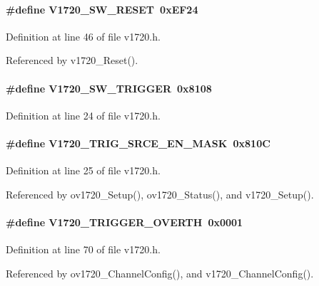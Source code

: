 \paragraph[{V1720\_\-SW\_\-RESET}]{\setlength{\rightskip}{0pt plus 5cm}\#define V1720\_\-SW\_\-RESET~0xEF24}\hfill\label{v1720_8h_a8f81434ad823f7ec252669892fabd1b0}


Definition at line 46 of file v1720.h.

Referenced by v1720\_\-Reset().
\paragraph[{V1720\_\-SW\_\-TRIGGER}]{\setlength{\rightskip}{0pt plus 5cm}\#define V1720\_\-SW\_\-TRIGGER~0x8108}\hfill\label{v1720_8h_ac69071dac426bfdeb9833f2f7107c5c1}


Definition at line 24 of file v1720.h.
\paragraph[{V1720\_\-TRIG\_\-SRCE\_\-EN\_\-MASK}]{\setlength{\rightskip}{0pt plus 5cm}\#define V1720\_\-TRIG\_\-SRCE\_\-EN\_\-MASK~0x810C}\hfill\label{v1720_8h_a994230a17671ae784a0aaf510f4905c4}


Definition at line 25 of file v1720.h.

Referenced by ov1720\_\-Setup(), ov1720\_\-Status(), and v1720\_\-Setup().
\paragraph[{V1720\_\-TRIGGER\_\-OVERTH}]{\setlength{\rightskip}{0pt plus 5cm}\#define V1720\_\-TRIGGER\_\-OVERTH~0x0001}\hfill\label{v1720_8h_a274111f2ae35e388f5f5a24b9d957916}


Definition at line 70 of file v1720.h.

Referenced by ov1720\_\-ChannelConfig(), and v1720\_\-ChannelConfig().
